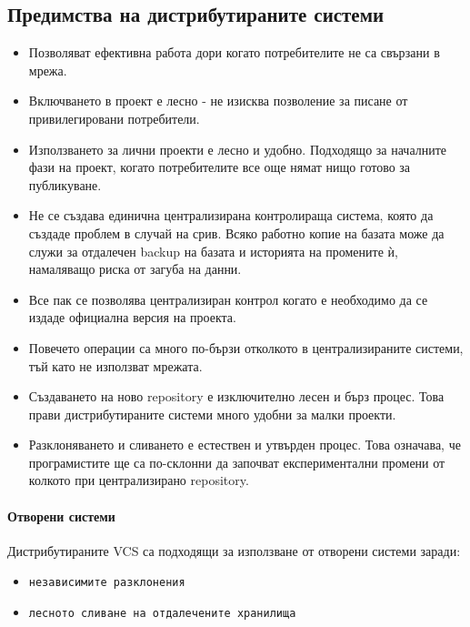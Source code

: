 \documentclass[a4paper]{article}
\begin{document}
  \subsection{Предимства на дистрибутираните системи}
    \begin{itemize}
      \item Позволяват ефективна работа дори когато потребителите не са
      свързани в мрежа.
      \item Включването в проект е лесно - не изисква позволение за писане от
      привилегировани потребители.
      \item Използването за лични проекти е лесно и удобно. Подходящо за
      началните фази на проект, когато потребителите все още нямат нищо готово
      за публикуване.
      \item Не се създава единична централизирана контролираща система, която
      да създаде проблем в случай на срив. Всяко работно копие на базата може
      да служи за отдалечен backup на базата и историята на промените ѝ,
      намаляващо риска от загуба на данни.
      \item Все пак се позволява централизиран контрол когато е необходимо да
      се издаде официална версия на проекта.
      \item Повечето операции са много по-бързи отколкото в централизираните
      системи, тъй като не използват мрежата.
      \item Създаването на ново repository е изключително лесен и бърз процес.
      Това прави дистрибутираните системи много удобни за малки проекти.
      \item Разклоняването и сливането е естествен и утвърден процес. Това
      означава, че програмистите ще са по-склонни да започват експериментални
      промени от колкото при централизирано repository.
    \end{itemize}

    \paragraph{Отворени системи}
      Дистрибутираните VCS са подходящи за използване от отворени системи заради:
      \begin{itemize}
        \item \texttt{независимите разклонения}
        \item \texttt{лесното сливане на отдалечените хранилища}
      \end{itemize}
\end{document}
